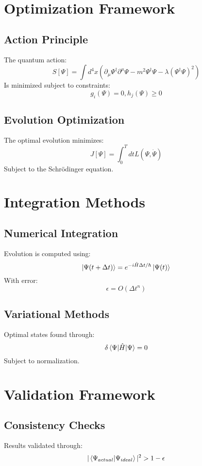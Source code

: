 \documentclass[12pt]{article}
\begin{document}
\section{Optimization Framework}
\subsection{Action Principle}
The quantum action:
\begin{equation}
S[\Psi] = \int d^4x(\partial_\mu\Psi^\dagger\partial^\mu\Psi - m^2\Psi^\dagger\Psi - \lambda(\Psi^\dagger\Psi)^2)
\end{equation}
Is minimized subject to constraints:
\begin{equation}
g_i(\Psi) = 0, h_j(\Psi) \geq 0
\end{equation}
\subsection{Evolution Optimization}
The optimal evolution minimizes:
\begin{equation}
J[\Psi] = \int_0^T dt L(\Psi,\dot{\Psi})
\end{equation}
Subject to the Schrödinger equation.
\section{Integration Methods}
\subsection{Numerical Integration}
Evolution is computed using:
\begin{equation}
\ket{\Psi(t+\Delta t)} = e^{-i\hat{H}\Delta t/\hbar}\ket{\Psi(t)}
\end{equation}
With error:
\begin{equation}
\epsilon = O(\Delta t^n)
\end{equation}
\subsection{Variational Methods}
Optimal states found through:
\begin{equation}
\delta\braket{\Psi|\hat{H}|\Psi} = 0
\end{equation}
Subject to normalization.
\section{Validation Framework}
\subsection{Consistency Checks}
Results validated through:
\begin{equation}
|\braket{\Psi_{actual}|\Psi_{ideal}}|^2 > 1-\epsilon
\end{equation}
\end{document}

